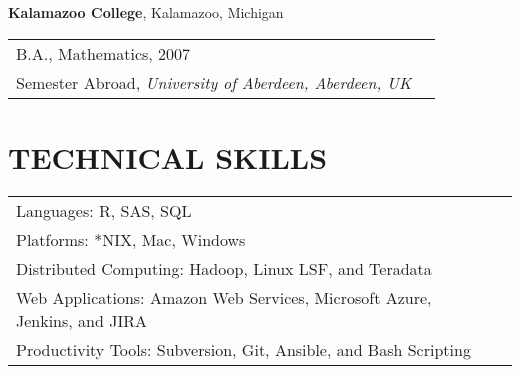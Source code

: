 \documentclass{res}
\begin{document}
\begin{resume}

\textbf{Kalamazoo College}, Kalamazoo, Michigan\\
\begin{tabular}{ p{10cm} l }
B.A., {Mathematics}, 2007\\
Semester Abroad, \textit{University of Aberdeen, Aberdeen, UK}
\end{tabular}


\section{TECHNICAL SKILLS} 
\vspace*{+0.2cm}
\begin{tabular}{ p{12cm} l }
Languages: R, SAS, SQL\\
Platforms: *NIX, Mac, Windows\\
Distributed Computing: Hadoop, Linux LSF, and Teradata\\
Web Applications: Amazon Web Services, Microsoft Azure, Jenkins, and JIRA\\
Productivity Tools: Subversion, Git, Ansible, and Bash Scripting\\ 
\end{tabular}

\renewcommand\refname{}

\end{resume}
\end{document}
